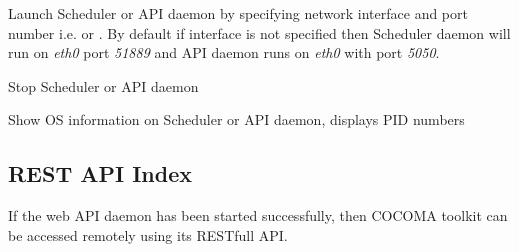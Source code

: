 \documentclass[letterpaper,10pt,english]{sphinxmanual}
\begin{document}

\begin{fulllineitems}
\label{01_how_to_use_it:cmdoption-ccmsh--start}
Launch Scheduler or API daemon by specifying network interface and port number i.e.  or  . By default if interface is not specified then Scheduler daemon will run on \emph{eth0} port \emph{51889} and API daemon runs on \emph{eth0} with port \emph{5050}.

\end{fulllineitems}


\begin{fulllineitems}
\label{01_how_to_use_it:cmdoption-ccmsh--stop}
Stop Scheduler or API daemon

\end{fulllineitems}


\begin{fulllineitems}
\label{01_how_to_use_it:cmdoption-ccmsh--show}
Show OS information on Scheduler or API daemon, displays PID numbers

\end{fulllineitems}



\subsection{REST API Index}
\label{01_how_to_use_it:rest-api-index}
If the web API daemon has been started successfully, then COCOMA toolkit can be accessed remotely using its RESTfull API.
\end{document}
